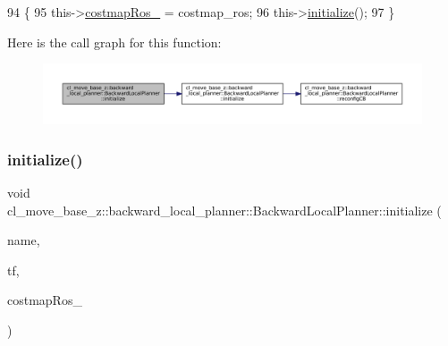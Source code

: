 \begin{DoxyCode}
94         \{
95             this->\hyperlink{classcl__move__base__z_1_1backward__local__planner_1_1BackwardLocalPlanner_a4136268882a105d9e06e173d85d5c0dc}{costmapRos\_} = costmap\_ros;
96             this->\hyperlink{classcl__move__base__z_1_1backward__local__planner_1_1BackwardLocalPlanner_a5c9815019cef272faed835cd8c575196}{initialize}();
97         \}
\end{DoxyCode}
Here is the call graph for this function\+:
\nopagebreak
\begin{figure}[H]
\begin{center}
\leavevmode
\includegraphics[width=350pt]{classcl__move__base__z_1_1backward__local__planner_1_1BackwardLocalPlanner_ae7659aa099ce5a329a9ef046dabcc599_cgraph}
\end{center}
\end{figure}
\mbox{\label{classcl__move__base__z_1_1backward__local__planner_1_1BackwardLocalPlanner_a9a854ad7d93c5db2efda316358aa845c}} 
\subsubsection{\texorpdfstring{initialize()}{initialize()}\hspace{0.1cm}{\footnotesize\ttfamily [2/3]}}
{\footnotesize\ttfamily void cl\+\_\+move\+\_\+base\+\_\+z\+::backward\+\_\+local\+\_\+planner\+::\+Backward\+Local\+Planner\+::initialize (\begin{DoxyParamCaption}\item[{std\+::string}]{name,  }\item[{tf2\+\_\+ros\+::\+Buffer $\ast$}]{tf,  }\item[{costmap\+\_\+2d\+::\+Costmap2\+D\+R\+OS $\ast$}]{costmap\+Ros\+\_\+ }\end{DoxyParamCaption})}



